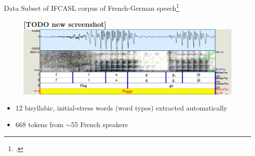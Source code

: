 \documentclass[xcolor={dvipsnames}]{beamer}
\newcommand{\TODO}[1]{{\color{red}\textbf{[TODO #1]}}}
\begin{document}
\begin{frame}{Data}
Subset of IFCASL corpus of French-German speech\footcite{Fauth2014}
		\begin{figure}
		\TODO{new screenshot}
		\includegraphics[width=\textwidth]{../../../colloquium/2SH05_FGMB1_527-flagge}
		\end{figure}

	

	\begin{itemize}
		\item{12 bisyllabic, initial-stress words (word types) extracted automatically}
		\item{668 tokens from $\sim$55 French speakers}
	\end{itemize}
\end{frame}
\end{document}
